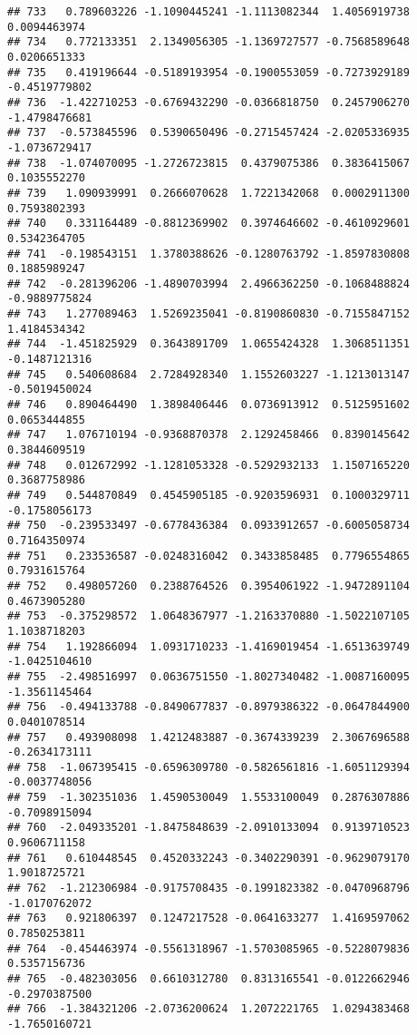 \documentclass[
]{article}
\begin{document}
\begin{verbatim}
## 733   0.789603226 -1.1090445241 -1.1113082344  1.4056919738  0.0094463974
## 734   0.772133351  2.1349056305 -1.1369727577 -0.7568589648  0.0206651333
## 735   0.419196644 -0.5189193954 -0.1900553059 -0.7273929189 -0.4519779802
## 736  -1.422710253 -0.6769432290 -0.0366818750  0.2457906270 -1.4798476681
## 737  -0.573845596  0.5390650496 -0.2715457424 -2.0205336935 -1.0736729417
## 738  -1.074070095 -1.2726723815  0.4379075386  0.3836415067  0.1035552270
## 739   1.090939991  0.2666070628  1.7221342068  0.0002911300  0.7593802393
## 740   0.331164489 -0.8812369902  0.3974646602 -0.4610929601  0.5342364705
## 741  -0.198543151  1.3780388626 -0.1280763792 -1.8597830808  0.1885989247
## 742  -0.281396206 -1.4890703994  2.4966362250 -0.1068488824 -0.9889775824
## 743   1.277089463  1.5269235041 -0.8190860830 -0.7155847152  1.4184534342
## 744  -1.451825929  0.3643891709  1.0655424328  1.3068511351 -0.1487121316
## 745   0.540608684  2.7284928340  1.1552603227 -1.1213013147 -0.5019450024
## 746   0.890464490  1.3898406446  0.0736913912  0.5125951602  0.0653444855
## 747   1.076710194 -0.9368870378  2.1292458466  0.8390145642  0.3844609519
## 748   0.012672992 -1.1281053328 -0.5292932133  1.1507165220  0.3687758986
## 749   0.544870849  0.4545905185 -0.9203596931  0.1000329711 -0.1758056173
## 750  -0.239533497 -0.6778436384  0.0933912657 -0.6005058734  0.7164350974
## 751   0.233536587 -0.0248316042  0.3433858485  0.7796554865  0.7931615764
## 752   0.498057260  0.2388764526  0.3954061922 -1.9472891104  0.4673905280
## 753  -0.375298572  1.0648367977 -1.2163370880 -1.5022107105  1.1038718203
## 754   1.192866094  1.0931710233 -1.4169019454 -1.6513639749 -1.0425104610
## 755  -2.498516997  0.0636751550 -1.8027340482 -1.0087160095 -1.3561145464
## 756  -0.494133788 -0.8490677837 -0.8979386322 -0.0647844900  0.0401078514
## 757   0.493908098  1.4212483887 -0.3674339239  2.3067696588 -0.2634173111
## 758  -1.067395415 -0.6596309780 -0.5826561816 -1.6051129394 -0.0037748056
## 759  -1.302351036  1.4590530049  1.5533100049  0.2876307886 -0.7098915094
## 760  -2.049335201 -1.8475848639 -2.0910133094  0.9139710523  0.9606711158
## 761   0.610448545  0.4520332243 -0.3402290391 -0.9629079170  1.9018725721
## 762  -1.212306984 -0.9175708435 -0.1991823382 -0.0470968796 -1.0170762072
## 763   0.921806397  0.1247217528 -0.0641633277  1.4169597062  0.7850253811
## 764  -0.454463974 -0.5561318967 -1.5703085965 -0.5228079836  0.5357156736
## 765  -0.482303056  0.6610312780  0.8313165541 -0.0122662946 -0.2970387500
## 766  -1.384321206 -2.0736200624  1.2072221765  1.0294383468 -1.7650160721

\end{verbatim}
\end{document}
